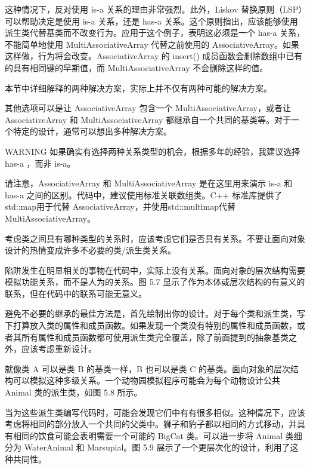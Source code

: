 这种情况下，反对使用 is-a 关系的理由非常强烈。此外，Liskov 替换原则（LSP）可以帮助决定是使用 is-a 关系，还是 has-a 关系。这个原则指出，应该能够使用派生类代替基类而不改变行为。应用于这个例子，表明这必须是一个 has-a 关系，不能简单地使用 MultiAssociativeArray 代替之前使用的 AssociativeArray。如果这样做，行为将会改变。AssociativeArray 的 insert() 成员函数会删除数组中已有的具有相同键的早期值，而 MultiAssociativeArray 不会删除这样的值。

本节中详细解释的两种解决方案，实际上并不仅有两种可能的解决方案。

其他选项可以是让 AssociativeArray 包含一个 MultiAssociativeArray，或者让 AssociativeArray 和 MultiAssociativeArray 都继承自一个共同的基类等。对于一个特定的设计，通常可以想出多种解决方案。

\begin{myWarning}{WARNING}
如果确实有选择两种关系类型的机会，根据多年的经验，我建议选择 has-a ，而非 is-a。
\end{myWarning}

请注意，AssociativeArray 和 MultiAssociativeArray 是在这里用来演示 is-a 和 has-a 之间的区别。代码中，建议使用标准关联数组类。C++ 标准库提供了std::map用于代替 AssociativeArray，并使用std::multimap代替 MultiAssociativeArray。


考虑类之间具有哪种类型的关系时，应该考虑它们是否具有关系。不要让面向对象设计的热情变成许多不必要的类/派生类关系。

陷阱发生在明显相关的事物在代码中，实际上没有关系。面向对象的层次结构需要模拟功能关系，而不是人为的关系。图 5.7 显示了作为本体或层次结构的有意义的联系，但在代码中的联系可能无意义。


避免不必要的继承的最佳方法是，首先绘制出你的设计。对于每个类和派生类，写下打算放入类的属性和成员函数。如果发现一个类没有特别的属性和成员函数，或者其所有属性和成员函数都可使用派生类完全覆盖，除了前面提到的抽象基类之外，应该考虑重新设计。


就像类 A 可以是类 B 的基类一样，B 也可以是类 C 的基类。面向对象的层次结构可以模拟这种多级关系。一个动物园模拟程序可能会为每个动物设计公共 Animal 类的派生类，如图 5.8 所示。


当为这些派生类编写代码时，可能会发现它们中有有很多相似。这种情况下，应该考虑将相同的部分放入一个共同的父类中。狮子和豹子都以相同的方式移动，并具有相同的饮食可能会表明需要一个可能的 BigCat 类。可以进一步将 Animal 类细分为 WaterAnimal 和 Marsupial。图 5.9 展示了一个更层次化的设计，利用了这种共同性。

